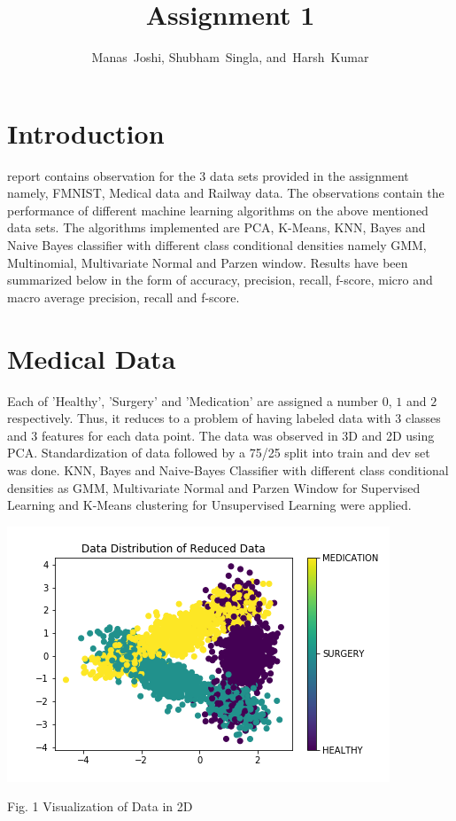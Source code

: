 \documentclass[12pt,journal,compsoc]{IEEEtran}
\begin{document}
%
\title{Assignment 1}

\author{Manas~Joshi,
        Shubham~Singla,
        and~Harsh~Kumar}%


\maketitle

\section{Introduction}
 report contains observation for the $3$ data sets provided in the assignment namely, FMNIST, Medical data and Railway data. The observations contain the performance of different machine learning algorithms on the above mentioned data sets. The algorithms implemented are PCA, K-Means, KNN, Bayes and Naive Bayes classifier with different class conditional densities namely GMM, Multinomial, Multivariate Normal and Parzen window. Results have been summarized below in the form of accuracy, precision, recall, f-score, micro and macro average precision, recall and f-score.

\section{Medical Data}
\noindent Each of 'Healthy', 'Surgery' and 'Medication' are assigned a number $0$, $1$ and $2$ respectively. Thus, it reduces to a problem of having labeled data with $3$ classes and $3$ features for each data point. The data was observed in 3D and 2D using PCA. Standardization of data followed by a 75/25 split into train and dev set was done. KNN, Bayes and Naive-Bayes Classifier with different class conditional densities as GMM, Multivariate Normal and Parzen Window for Supervised Learning and K-Means clustering for Unsupervised Learning were applied.
\begin{center}
\includegraphics[scale=0.35]{2d_medical.png}

{\small Fig. 1 Visualization of Data in 2D}
\end{center}
\end{document}
